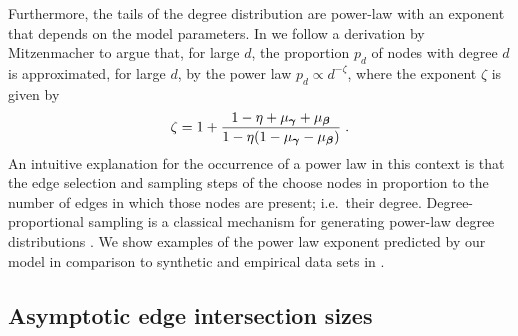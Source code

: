 Furthermore, the tails of the degree distribution are power-law with an exponent that depends on the model parameters. 
In  we follow a derivation by Mitzenmacher \cite{mitzenmacherBriefHistoryGenerative2004} to argue that, for large $d$, the proportion $p_d$ of nodes with degree $d$ is approximated, for large $d$, by the power law $p_d \propto d^{-\zeta}$, where the exponent $\zeta$ is given by 
\begin{align}
    \zeta = 1 + \frac{1 - \eta + \mu_{\boldsymbol{\gamma}} + \mu_{\boldsymbol{\beta}}}{1 - \eta(1 - \mu_{\boldsymbol{\gamma}} - \mu_{\boldsymbol{\beta}})}\;. \label{eq:power-law-exponent}
\end{align}
An intuitive explanation for the occurrence of a power law in this context is that the edge selection and sampling steps of the \model choose nodes in proportion to the number of edges in which those nodes are present; i.e.\ their degree. 
Degree-proportional sampling is a classical mechanism for generating power-law degree distributions \cite{barabasiEmergenceScalingRandom1999,kleinbergWebGraphMeasurements1999}. 
We show examples of the power law exponent predicted by our model in comparison to synthetic and empirical data sets in  . 

 
\subsection*{Asymptotic edge intersection sizes}


